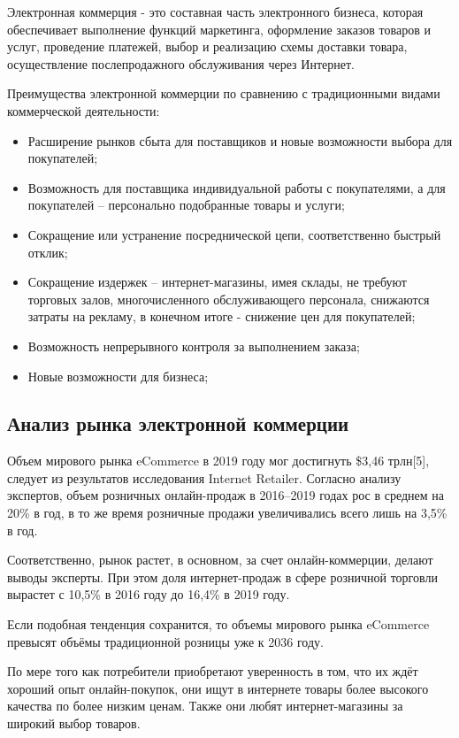 Электронная коммерция - это составная часть электронного бизнеса, которая обеспечивает выполнение функций маркетинга, оформление заказов товаров и услуг, проведение платежей, выбор и реализацию схемы доставки товара, осуществление послепродажного обслуживания через Интернет.

Преимущества электронной коммерции по сравнению с традиционными видами коммерческой деятельности:
\begin{itemize}
  \item Расширение рынков сбыта для поставщиков и новые возможности выбора для покупателей;
  \item Возможность для поставщика индивидуальной работы с покупателями, а для покупателей – персонально подобранные товары и услуги;
  \item Сокращение или устранение посреднической цепи, соответственно быстрый отклик;
  \item Сокращение издержек – интернет-магазины, имея склады, не требуют торговых залов, многочисленного обслуживающего персонала, снижаются затраты на рекламу, в конечном итоге - снижение цен для покупателей;
  \item Возможность непрерывного контроля за выполнением заказа;
  \item Новые возможности для бизнеса;
\end{itemize}

\subsection{Анализ рынка электронной коммерции}
Объем мирового рынка eCommerce в 2019 году мог достигнуть \$3,46 трлн[5], следует из результатов исследования Internet Retailer.
Согласно анализу экспертов, объем розничных онлайн-продаж в 2016–2019 годах рос в среднем на 20\% в год, в то же время розничные продажи увеличивались всего лишь на 3,5\% в год.

Соответственно, рынок растет, в основном, за счет онлайн-коммерции, делают выводы эксперты. При этом доля интернет-продаж в сфере розничной торговли вырастет с 10,5\% в 2016 году до 16,4\% в 2019 году.

Если подобная тенденция сохранится, то объемы мирового рынка eCommerce превысят объёмы традиционной розницы уже к 2036 году.

По мере того как потребители приобретают уверенность в том, что их ждёт хороший опыт онлайн-покупок, они ищут в интернете товары более высокого качества по более низким ценам.
Также они любят интернет-магазины за широкий выбор товаров.

